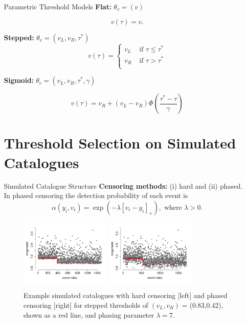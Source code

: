 \begin{frame}{Parametric Threshold Models}
\textbf{Flat:} $\theta_v=(v)$

$$v(\tau)= v.$$  

\textbf{Stepped:} $\theta_v=(v_L, v_R, \tau^*)$
\[
v(\tau)=\left\{ 
\begin{array}{ll}
v_L & \mbox{ if }\tau\le \tau^*\\
v_R & \mbox{ if } \tau > \tau^*\\
\end{array}
\right.
\]

\textbf{Sigmoid:} $\theta_v=(v_L, v_R, \tau^*, \gamma)$

\[
v(\tau)=v_R+(v_L-v_R)\Phi\left(\frac{\tau^*-\tau}{\gamma}\right)
\]
\end{frame}

\section{Threshold Selection on Simulated Catalogues}

\begin{frame}{Simulated Catalogue Structure}
\textbf{Censoring methods:} (i) hard and (ii) phased.
%
In phased censoring the detection probability of each event is 
\[
\alpha(y_i,v_i) = \exp(-\lambda[v_i-y_i]_+), \mbox{ where } \lambda>0.
\]
%
\begin{figure}[hbt!]
    \centering
    \includegraphics[width = 0.4\textwidth]{images/step_threshold_sim/example_cat_stepped_hard.pdf}
    \qquad
    \includegraphics[width = 0.4\textwidth]{images/step_threshold_sim/example_cat_stepped_phased.pdf}
    \caption{Example simulated catalogues with hard censoring [left] and phased censoring [right] for stepped thresholds of $(v_L,v_R)$ = (0.83,0.42), shown as a red line,  and phasing parameter $\lambda = 7$.}
    \label{fig:stepped_cat_examples}
\end{figure}    
\end{frame}

